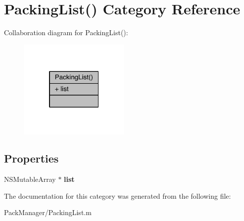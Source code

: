 \hypertarget{category_packing_list_07_08}{\section{Packing\-List() Category Reference}
\label{category_packing_list_07_08}
}


Collaboration diagram for Packing\-List()\-:\nopagebreak
\begin{figure}[H]
\begin{center}
\leavevmode
\includegraphics[width=152pt]{category_packing_list_07_08__coll__graph}
\end{center}
\end{figure}
\subsection*{Properties}
\begin{DoxyCompactItemize}
\item 
\hypertarget{category_packing_list_07_08_a292ad22790d68f0529063efcb9c043f4}{N\-S\-Mutable\-Array $\ast$ {\bfseries list}}\label{category_packing_list_07_08_a292ad22790d68f0529063efcb9c043f4}

\end{DoxyCompactItemize}


The documentation for this category was generated from the following file\-:\begin{DoxyCompactItemize}
\item 
Pack\-Manager/Packing\-List.\-m\end{DoxyCompactItemize}
